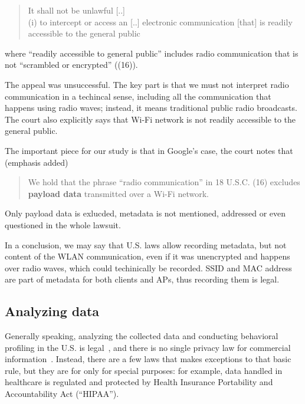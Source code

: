 \documentclass[12pt,a4paper,oneside,pdftex]{report}
\begin{document}
\begin{quote}
    It shall not be unlawful [..] \\
    (i) to intercept or access an [..] electronic communication [that] is readily accessible to the general public
\end{quote}

where ``readily accessible to general public'' includes radio communication that is not ``scrambled or encrypted'' ((16)). 

The appeal was unsuccessful. The key part is that we must not interpret radio communication in a techincal sense, including all the communication that happens using radio waves; instead, it means traditional public radio broadcasts. The court also explicitly says that Wi-Fi network is not readily accessible to the general public.

The important piece for our study is that in Google's case, the court notes that~\cite{google_joffe} (emphasis added)

\begin{quote}
    We hold that the phrase ``radio communication'' in 18 U.S.C. (16) excludes \textbf{payload data} transmitted over a Wi-Fi network.
\end{quote}

Only payload data is exlucded, metadata is not mentioned, addressed or even questioned in the whole lawsuit.

In a conclusion, we may say that U.S. laws allow recording metadata, but not content of the WLAN communication, even if it was unencrypted and happens over radio waves, which could techinically be recorded. SSID and MAC address are part of metadata for both clients and APs, thus recording them is legal.

\subsection{Analyzing data}

Generally speaking, analyzing the collected data and conducting behavioral profiling in the U.S. is legal~\cite{jennings2012track}, and there is no single privacy law for commercial information~\cite{yeatesprivacy,jennings2012track}. Instead, there are a few laws that makes exceptions to that basic rule, but they are for only for special purposes: for example, data handled in healthcare is regulated and protected by Health Insurance Portability and Accountability Act (``HIPAA'').~\cite{jennings2012track}
\end{document}
